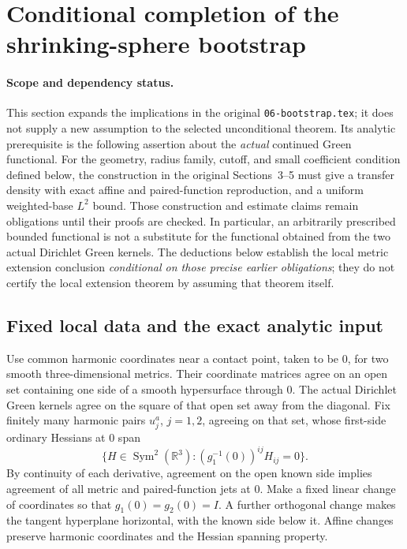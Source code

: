 \documentclass[11pt]{article}
\theoremstyle{definition}
\theoremstyle{remark}
\numberwithin{equation}{section}
\begin{document}

\section{Conditional completion of the shrinking-sphere bootstrap}
\label{bootstrap-expanded:section}

\paragraph{Scope and dependency status.}
This section expands the implications in the original
\texttt{06-bootstrap.tex}; it does not supply a new assumption to the
selected unconditional theorem.  Its analytic prerequisite is the
following assertion about the \emph{actual} continued Green functional.
For the geometry, radius family, cutoff, and small coefficient condition
defined below, the construction in the original Sections~3--5 must give
a transfer density with exact affine and paired-function reproduction,
and a uniform weighted-base $L^2$ bound.  Those construction and estimate
claims remain obligations until their proofs are checked.  In
particular, an arbitrarily prescribed bounded functional is not a
substitute for the functional obtained from the two actual Dirichlet
Green kernels.  The deductions below establish the local metric
extension conclusion \emph{conditional on those precise earlier
obligations}; they do not certify the local extension theorem by
assuming that theorem itself.

\subsection{Fixed local data and the exact analytic input}
\label{bootstrap-expanded:input}

Use common harmonic coordinates near a contact point, taken to be $0$,
for two smooth three-dimensional metrics.  Their coordinate matrices
agree on an open set containing one side of a smooth hypersurface
through $0$.  The actual Dirichlet Green kernels agree on the square of
that open set away from the diagonal.  Fix finitely many harmonic pairs
$u_j^a$, $j=1,2$, agreeing on that set, whose first-side ordinary Hessians
at $0$ span
\[
 \{H\in\operatorname{Sym}^2(\mathbb R^3):
                  (g_1^{-1}(0))^{ij}H_{ij}=0\}.
\]
By continuity of each derivative, agreement on the open known side
implies agreement of all metric and paired-function jets at $0$.
Make a fixed linear change of coordinates so that
$g_1(0)=g_2(0)=I$.  A further orthogonal change makes the tangent
hyperplane horizontal, with the known side below it.  Affine changes
preserve harmonic coordinates and the Hessian spanning property.
\end{document}
